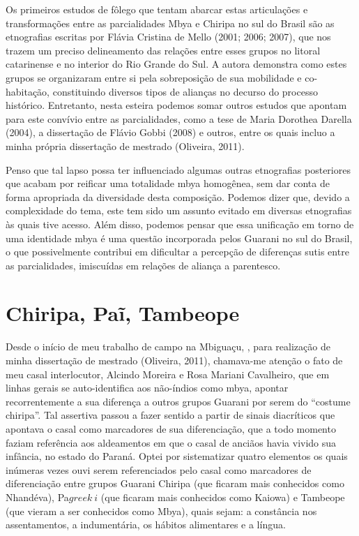 {{Os primeiros estudos de fôlego que tentam abarcar estas articulações e
transformações entre as parcialidades Mbya e Chiripa no sul do Brasil
são as etnografias escritas por Flávia Cristina de Mello (2001; 2006;
2007), que nos trazem um preciso delineamento das relações entre esses
grupos no litoral catarinense e no interior do Rio Grande do Sul. A
autora demonstra como estes grupos se organizaram entre si pela
sobreposição de sua mobilidade e co-habitação, constituindo diversos
tipos de alianças no decurso do processo histórico. Entretanto, nesta
esteira podemos somar outros estudos que apontam para este convívio
entre as parcialidades, como a tese de Maria Dorothea Darella (2004), a
dissertação de Flávio Gobbi (2008) e outros, entre os quais incluo a
minha própria dissertação de mestrado (Oliveira, 2011). 

Penso que tal lapso possa ter influenciado algumas outras etnografias
posteriores que acabam por reificar uma totalidade mbya homogênea, sem
dar conta de forma apropriada da diversidade desta composição. Podemos
dizer que, devido a complexidade do tema, este tem sido um assunto
evitado em diversas etnografias às quais tive acesso. Além disso,
podemos pensar que essa unificação em torno de uma identidade mbya é
uma questão incorporada pelos Guarani no sul do Brasil, o que
possivelmente contribui em dificultar a percepção de diferenças sutis
entre as parcialidades, imiscuídas em relações de aliança a parentesco.

\section{Chiripa, Paĩ, Tambeope}

Desde o início de meu trabalho de campo na  Mbiguaçu, , para
realização de minha dissertação de mestrado (Oliveira, 2011),
chamava-me atenção o fato de meu casal interlocutor, Alcindo Moreira e
Rosa Mariani Cavalheiro, que em linhas gerais se auto-identifica aos
não-índios como mbya, apontar recorrentemente a sua diferença a outros
grupos Guarani por serem do ``costume chiripa''. Tal assertiva passou a
fazer sentido a partir de sinais diacríticos que apontava o casal como
marcadores de sua diferenciação, que a todo momento faziam referência
aos aldeamentos em que o casal de anciãos havia vivido sua infância, no
estado do Paraná. Optei por sistematizar quatro elementos os quais
inúmeras vezes ouvi serem referenciados pelo casal como marcadores de
diferenciação entre grupos Guarani Chiripa (que ficaram mais conhecidos
como Nhandéva), Pa${greek{~i}}$ (que ficaram mais conhecidos
como Kaiowa) e Tambeope (que vieram a ser conhecidos como Mbya), quais
sejam: a constância nos assentamentos, a indumentária, os hábitos
alimentares e a língua. 

}}

